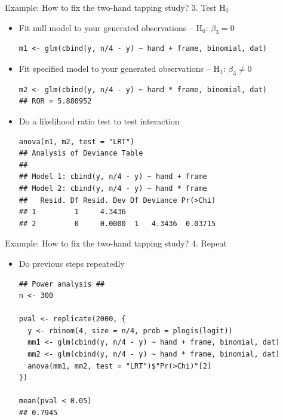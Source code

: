 \documentclass[aspectratio=169]{beamer}
\begin{document}
\begin{frame}[fragile]{Example: How to fix the two-hand tapping study?}
  {3. Test H$_0$}
  \begin{itemize}
    \item Fit null model to your generated observations -- H$_0$: $
      \beta_3 = 0$
\begin{lstlisting}
m1 <- glm(cbind(y, n/4 - y) ~ hand + frame, binomial, dat)
\end{lstlisting}
    \item Fit specified model to your generated observations -- H$_1$:
      $\beta_3 \neq 0$
\begin{lstlisting}
m2 <- glm(cbind(y, n/4 - y) ~ hand * frame, binomial, dat)
## ROR = 5.880952
\end{lstlisting}
    \item Do a likelihood ratio test to test interaction
\begin{lstlisting}
anova(m1, m2, test = "LRT")
## Analysis of Deviance Table
## 
## Model 1: cbind(y, n/4 - y) ~ hand + frame
## Model 2: cbind(y, n/4 - y) ~ hand * frame
##   Resid. Df Resid. Dev Df Deviance Pr(>Chi)  
## 1         1     4.3436                       
## 2         0     0.0000  1   4.3436  0.03715

\end{lstlisting}
  \end{itemize}
\end{frame}


\begin{frame}[fragile]{Example: How to fix the two-hand tapping study?}
  {4. Repeat}
  \begin{itemize}
    \item Do previous steps repeatedly
\begin{lstlisting}
## Power analysis ##
n <- 300

pval <- replicate(2000, {
  y <- rbinom(4, size = n/4, prob = plogis(logit))
  mm1 <- glm(cbind(y, n/4 - y) ~ hand + frame, binomial, dat)
  mm2 <- glm(cbind(y, n/4 - y) ~ hand * frame, binomial, dat)
  anova(mm1, mm2, test = "LRT")$"Pr(>Chi)"[2]
})

mean(pval < 0.05)
## 0.7945
\end{lstlisting}
  \end{itemize}
\end{frame}
\end{document}
